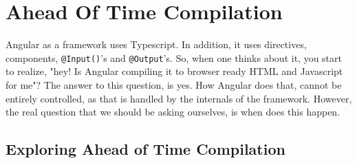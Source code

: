 \chapter{ Ahead Of Time Compilation }
Angular as a framework uses Typescript. In addition, it uses directives, components, 
\lstinline{@Input()}'s and \lstinline{@Output}'s. So, when one thinks about it, you 
start to realize, "hey! Is Angular compiling it to browser ready HTML and Javascript 
for me"? The answer to this question, is yes. How Angular does that, cannot be entirely 
controlled, as that is handled by the internals of the framework. However, the 
real question that we should be asking ourselves, is when does this happen. 

\section{Exploring Ahead of Time Compilation}